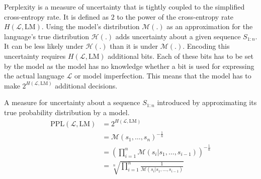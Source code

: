     Perplexity is a measure of uncertainty that is tightly coupled to the simplified cross-entropy rate.
    It is defined as $2$ to the power of the cross-entropy rate $H(\mathcal{L}, \mathrm{LM})$.
    Using the model's distribution $\mathcal{M}(.)$ as an approximation for the language's true distribution $\mathcal{H}(.)$ adds uncertainty about a given sequence $S_{1:n}$. It can be less likely under $\mathcal{H}(.)$ than it is under $\mathcal{M}(.)$.
    Encoding this uncertainty requires $H(\mathcal{L}, \mathrm{LM})$ additional bits.
    Each of these bits has to be set by the model as the model has no knowledge whether a bit is used for expressing the actual language $\mathcal{L}$ or model imperfection.
    This means that the model has to make $2^{H(\mathcal{L}, \mathrm{LM})}$ additional decisions.
    \begin{definition}
    \label{def:ppl}
        A measure for uncertainty about a sequence $S_{1:n}$ introduced by approximating its true probability distribution by a model.
        \begin{equation}
        \begin{split}
            \text{PPL}(\mathcal{L}, \mathrm{LM}) & = 2^{H(\mathcal{L}, \mathrm{LM})} \\
                & = \mathcal{M}(s_1, \dots, s_n)^{-\frac{1}{n}} \\
                & = \left( \prod_{i=1}^{n} \mathcal{M}(s_i | s_1, \dots, s_{i-1}) \right)^{- \frac{1}{n}} \\
                & = \sqrt[n]{\prod_{i=1}^{n} \frac{1}{\mathcal{M}(s_i | s_1, \dots, s_{i-1})}}
        \end{split}
        \end{equation}
    \end{definition}
    
